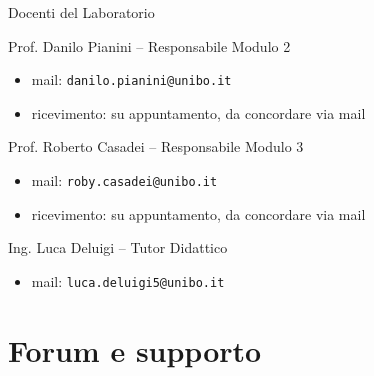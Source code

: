 \documentclass[xcolor=dvipsnames,presentation]{beamer}
\begin{document}
\begin{frame}{Docenti del Laboratorio}
    \begin{block}{Prof. Danilo Pianini -- Responsabile Modulo 2}
        \begin{itemize}
            \item mail: \texttt{danilo.pianini@unibo.it}
            \item ricevimento: su appuntamento, da concordare via mail
        \end{itemize}
    \end{block}
    \begin{block}{Prof. Roberto Casadei -- Responsabile Modulo 3}
        \begin{itemize}
            \item mail: \texttt{roby.casadei@unibo.it}
            \item ricevimento: su appuntamento, da concordare via mail
        \end{itemize}
    \end{block}
    \begin{block}{Ing. Luca Deluigi -- Tutor Didattico}
        \begin{itemize}
            \item mail: \texttt{luca.deluigi5@unibo.it}
        \end{itemize}
    \end{block}
\end{frame}

\section{Forum e supporto}
\end{document}
